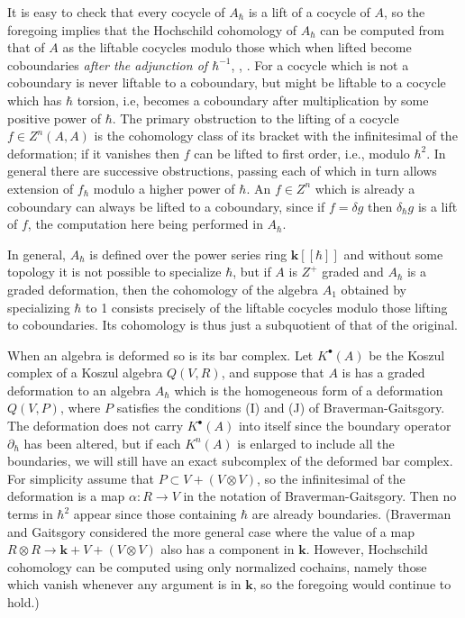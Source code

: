 \documentclass{amsart}
\begin{document}
It is easy to check that every cocycle of $A_{\hbar}$ is a lift of a cocycle of $A$, so the foregoing implies that  
the Hochschild cohomology of $A_{\hbar}$ can be computed from that of $A$ as the liftable cocycles modulo those which when lifted become coboundaries \emph{after the adjunction of $\hbar^{-1}$}, \cite{G:Def4}, \cite{GerstGiaquint:Weyl}. For a cocycle which is not a coboundary is never liftable to a coboundary, but  might be liftable to a cocycle which has $\hbar$ torsion, i.e, becomes a coboundary after multiplication by some positive power of $\hbar$. The primary obstruction to the lifting of a cocycle $f\in Z^n(A,A)$ is the cohomology class of its bracket with the infinitesimal of the deformation; if it vanishes then $f$ can be lifted  to first order, i.e., modulo $\hbar^2$. In general there are successive obstructions, passing each of which in turn allows extension of $f_{\hbar}$ modulo a higher power of  $\hbar$.  An $f \in Z^n$ which is already a coboundary can always be lifted to a coboundary, since if $f = \delta g$ then $\delta_{\hbar}g$ is a lift of $f$, the computation here being performed in $A_{\hbar}$.  

In general, $A_{\hbar}$ is defined over the power series ring ${\ensuremath{\mathbf{k}}}[[\hbar]]$ and without some topology it is not possible to specialize $\hbar$, but if $A$ is $Z^+$ graded and  $A_{\hbar}$ is a graded deformation, then
the cohomology of the algebra $A_1$ obtained by specializing $\hbar$ to 1 consists precisely of the liftable cocycles modulo those lifting to coboundaries. Its cohomology is thus just a subquotient of that of the original. 

When an algebra is deformed so is its bar complex.  Let $K^{\bullet}(A)$ be the Koszul complex of a Koszul algebra $Q(V, R)$, and suppose that $A$ is has a graded deformation to an algebra $A_{\hbar}$ which is the homogeneous form of a deformation $Q(V, P)$, where $P$ satisfies the conditions (I) and (J) of {Braverman-Gaitsgory}.  The deformation does not carry $K^{\bullet}(A)$ into itself since the boundary operator $\partial_{\hbar}$ has been altered, but if each $K^n(A)$ is enlarged to include all the boundaries, we will still have an exact subcomplex of the deformed bar complex. For simplicity assume that $P \subset V + (V\otimes V)$, so the infinitesimal of the deformation is a map $\alpha: R \to V$ in the notation of {Braverman-Gaitsgory}. Then no terms in ${\hbar}^2$ appear since those containing ${\hbar}$ are already boundaries.  (Braverman and Gaitsgory considered the more general case where the value of a map $R\otimes R \to {\ensuremath{\mathbf{k}}} +V +(V\otimes V)$  also has a component in ${\ensuremath{\mathbf{k}}}$. However, Hochschild cohomology can be computed using only normalized cochains, namely those which vanish whenever any argument is in ${\ensuremath{\mathbf{k}}}$, so the foregoing would continue to hold.)
\end{document}
